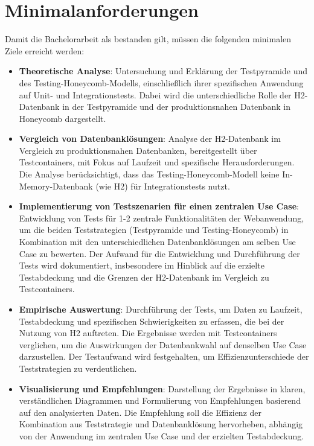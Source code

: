 \chapter{Minimalanforderungen}

Damit die Bachelorarbeit als bestanden gilt, müssen die folgenden minimalen Ziele erreicht werden:

\begin{itemize}
	\item \textbf{Theoretische Analyse}: Untersuchung und Erklärung der Testpyramide und des Testing-Honeycomb-Modells, einschließlich ihrer spezifischen Anwendung auf Unit- und Integrationstests. Dabei wird die unterschiedliche Rolle der H2-Datenbank in der Testpyramide und der produktionsnahen Datenbank in Honeycomb dargestellt.
	
	\item \textbf{Vergleich von Datenbanklösungen}: Analyse der H2-Datenbank im Vergleich zu produktionsnahen Datenbanken, bereitgestellt über Testcontainers, mit Fokus auf Laufzeit und spezifische Herausforderungen. Die Analyse berücksichtigt, dass das Testing-Honeycomb-Modell keine In-Memory-Datenbank (wie H2) für Integrationstests nutzt.
	
	\item \textbf{Implementierung von Testszenarien für einen zentralen Use Case}: Entwicklung von Tests für 1-2 zentrale Funktionalitäten der Webanwendung, um die beiden Teststrategien (Testpyramide und Testing-Honeycomb) in Kombination mit den unterschiedlichen Datenbanklösungen am selben Use Case zu bewerten. Der Aufwand für die Entwicklung und Durchführung der Tests wird dokumentiert, insbesondere im Hinblick auf die erzielte Testabdeckung und die Grenzen der H2-Datenbank im Vergleich zu Testcontainers.
	
	\item \textbf{Empirische Auswertung}: Durchführung der Tests, um Daten zu Laufzeit, Testabdeckung und spezifischen Schwierigkeiten zu erfassen, die bei der Nutzung von H2 auftreten. Die Ergebnisse werden mit Testcontainers verglichen, um die Auswirkungen der Datenbankwahl auf denselben Use Case darzustellen. Der Testaufwand wird festgehalten, um Effizienzunterschiede der Teststrategien zu verdeutlichen.
	
	\item \textbf{Visualisierung und Empfehlungen}: Darstellung der Ergebnisse in klaren, verständlichen Diagrammen und Formulierung von Empfehlungen basierend auf den analysierten Daten. Die Empfehlung soll die Effizienz der Kombination aus Teststrategie und Datenbanklösung hervorheben, abhängig von der Anwendung im zentralen Use Case und der erzielten Testabdeckung.
\end{itemize}
